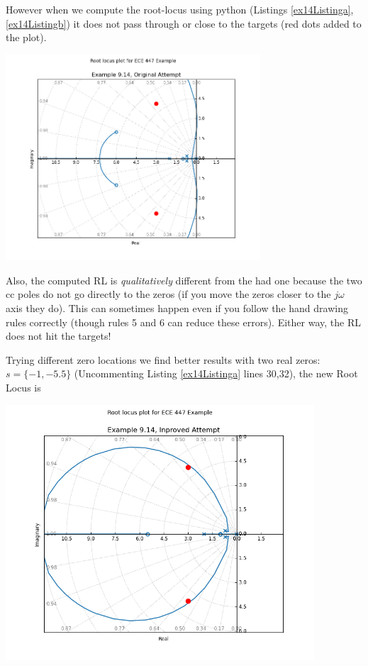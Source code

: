 \begin{ExampleCont}
However when we compute the root-locus using python
(Listings \ref{ex14Listinga},\ref{ex14Listingb})
it does not pass through or close to the targets (red dots added to the plot).

\begin{center}
  \includegraphics[width=95mm]{figs09/R27J16.png}
\end{center}

Also, the computed RL is {\it qualitatively } different from the had one because the two cc poles
do not go directly to the zeros (if you move the zeros closer to the $j\omega$ axis they do).
This can sometimes happen even if you follow the hand drawing rules correctly
(though rules 5 and 6 can reduce these errors).   Either way, the RL does not hit the targets!

Trying different zero locations we find better results with two real
zeros: $s= \{-1,-5.5\}$ (Uncommenting Listing \ref{ex14Listinga} lines 30,32),
the new Root Locus is

\begin{center}
\includegraphics[width=115mm]{figs09/R27J17.png}
\end{center}


\end{ExampleCont}

